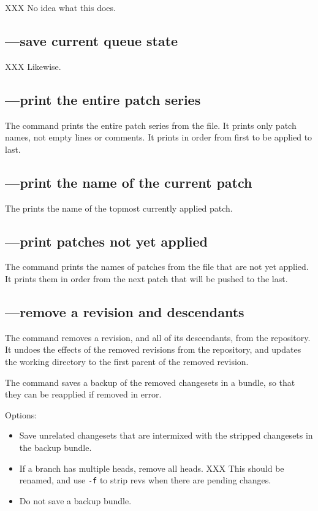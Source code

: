 XXX No idea what this does.

\subsection{---save current queue state}

XXX Likewise.

\subsection{---print the entire patch series}

The  command prints the entire patch series from the
 file.  It prints only patch names, not empty lines
or comments.  It prints in order from first to be applied to last.

\subsection{---print the name of the current patch}

The  prints the name of the topmost currently applied
patch.

\subsection{---print patches not yet applied}

The  command prints the names of patches from the
 file that are not yet applied.  It prints them in
order from the next patch that will be pushed to the last.

\subsection{---remove a revision and descendants}

The  command removes a revision, and all of its
descendants, from the repository.  It undoes the effects of the
removed revisions from the repository, and updates the working
directory to the first parent of the removed revision.

The  command saves a backup of the removed changesets in
a bundle, so that they can be reapplied if removed in error.

Options:
\begin{itemize}
\item[\hgopt{strip}{-b}] Save unrelated changesets that are intermixed
  with the stripped changesets in the backup bundle.
\item[\hgopt{strip}{-f}] If a branch has multiple heads, remove all
  heads. XXX This should be renamed, and use \texttt{-f} to strip revs
  when there are pending changes.
\item[\hgopt{strip}{-n}] Do not save a backup bundle.
\end{itemize}

